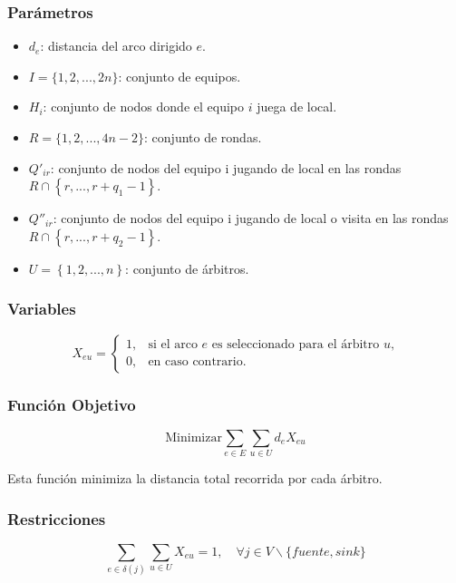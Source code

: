 \documentclass[letter, 10pt]{article}
\begin{document}
\subsubsection{Par\'ametros}
\begin{itemize}
  \item $d_e$: distancia del arco dirigido $e$.
  \item $I = \{1, 2, ..., 2n\}$: conjunto de equipos.
  \item $H_i$: conjunto de nodos donde el equipo $i$ juega de local.
  \item $R = \{1, 2, ..., 4n - 2\}$: conjunto de rondas.
  \item $Q'_{ir}$: conjunto de nodos del equipo i jugando de local en las rondas $R \cap \left\{r, ..., r + q_1 - 1\right\}$.
  \item $Q''_{ir}$: conjunto de nodos del equipo i jugando de local o visita en las rondas $R \cap \left\{r, ..., r + q_2 - 1\right\}$.
  \item $U = \left\{1, 2, ..., n\right\}$: conjunto de \'arbitros.
\end{itemize}

\subsubsection{Variables}
\begin{equation*}
  X_{eu}=\begin{cases}
    1, & \text{si el arco $e$ es seleccionado para el \'arbitro $u$,} \\
    0, & \text{en caso contrario}.
  \end{cases}
\end{equation*}

\subsubsection{Funci\'on Objetivo}
\begin{equation*}
  \text{Minimizar} \displaystyle\sum_{e \in E}\displaystyle\sum_{u \in U} d_eX_{eu}
\end{equation*}

Esta funci\'on minimiza la distancia total recorrida por cada \'arbitro.

\subsubsection{Restricciones}

\begin{equation} \label{2_1}
  \displaystyle\sum_{e \in \delta(j)}\displaystyle\sum_{u \in U}X_{eu}=1, \quad\forall j \in V \backslash \{fuente, sink\}
\end{equation}
\end{document}

